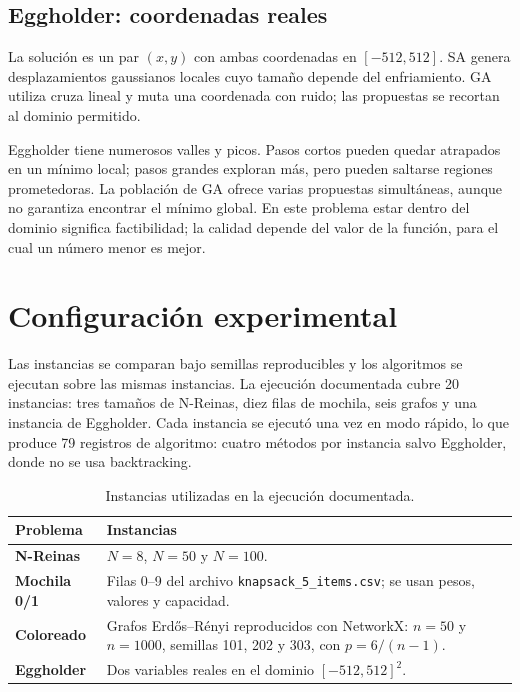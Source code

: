 \documentclass[12pt,letterpaper]{article}
\begin{document}
\subsection{Eggholder: coordenadas reales}

La solución es un par $(x,y)$ con ambas coordenadas en $[-512,512]$. SA genera
desplazamientos gaussianos locales cuyo tamaño depende del enfriamiento. GA
utiliza cruza lineal y muta una coordenada con ruido; las propuestas se recortan
al dominio permitido.

Eggholder tiene numerosos valles y picos. Pasos cortos pueden quedar atrapados
en un mínimo local; pasos grandes exploran más, pero pueden saltarse regiones
prometedoras. La población de GA ofrece varias propuestas simultáneas, aunque
no garantiza encontrar el mínimo global. En este problema estar dentro del
dominio significa factibilidad; la calidad depende del valor de la función,
para el cual un número menor es mejor.

\section{Configuración experimental}

Las instancias se comparan bajo semillas reproducibles y los algoritmos se
ejecutan sobre las mismas instancias. La ejecución documentada cubre 20
instancias: tres tamaños de N-Reinas, diez filas de mochila, seis grafos y una
instancia de Eggholder. Cada instancia se ejecutó una vez en modo rápido, lo
que produce 79 registros de algoritmo: cuatro métodos por instancia salvo
Eggholder, donde no se usa backtracking.

\begin{table}[H]
  \centering
  \caption{Instancias utilizadas en la ejecución documentada.}
  \begin{tabularx}{\textwidth}{>{\bfseries}p{3.0cm} X}
    \toprule
    Problema & Instancias \\
    \midrule
    N-Reinas & $N=8$, $N=50$ y $N=100$. \\
    Mochila 0/1 & Filas 0--9 del archivo \texttt{knapsack\_5\_items.csv}; se usan pesos, valores y capacidad. \\
    Coloreado & Grafos Erdős--Rényi reproducidos con NetworkX: $n=50$ y $n=1000$, semillas 101, 202 y 303, con $p=6/(n-1)$. \\
    Eggholder & Dos variables reales en el dominio $[-512,512]^2$. \\
    \bottomrule
  \end{tabularx}
\end{table}
\end{document}
